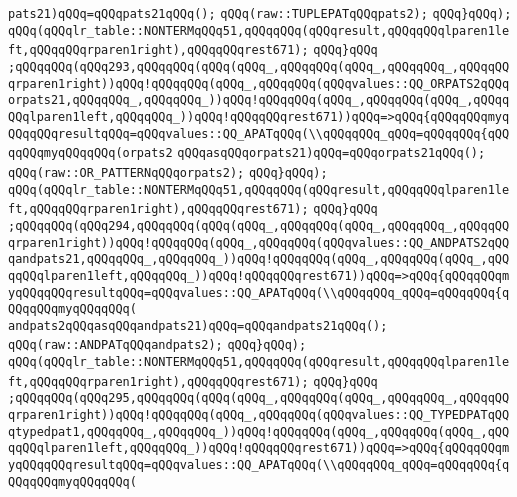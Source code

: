 \verb|pats21)qQQq=qQQqpats21qQQq();|\newline
\verb|qQQq(raw::TUPLEPATqQQqpats2);|\newline
\verb|qQQq}qQQq);|\newline
\verb|qQQq(qQQqlr_table::NONTERMqQQq51,qQQqqQQq(qQQqresult,qQQqqQQqlparen1left,qQQqqQQqrparen1right),qQQqqQQqrest671);|\newline
\verb|qQQq}qQQq|\newline
\verb|;qQQqqQQq(qQQq293,qQQqqQQq(qQQq(qQQq_,qQQqqQQq(qQQq_,qQQqqQQq_,qQQqqQQqrparen1right))qQQq!qQQqqQQq(qQQq_,qQQqqQQq(qQQqvalues::QQ_ORPATS2qQQqorpats21,qQQqqQQq_,qQQqqQQq_))qQQq!qQQqqQQq(qQQq_,qQQqqQQq(qQQq_,qQQqqQQqlparen1left,qQQqqQQq_))qQQq!qQQqqQQqrest671))qQQq=>qQQq{qQQqqQQqmyqQQqqQQqresultqQQq=qQQqvalues::QQ_APATqQQq(\\qQQqqQQq_qQQq=qQQqqQQq{qQQqqQQqmyqQQqqQQq(orpats2|\newline
\verb|qQQqasqQQqorpats21)qQQq=qQQqorpats21qQQq();|\newline
\verb|qQQq(raw::OR_PATTERNqQQqorpats2);|\newline
\verb|qQQq}qQQq);|\newline
\verb|qQQq(qQQqlr_table::NONTERMqQQq51,qQQqqQQq(qQQqresult,qQQqqQQqlparen1left,qQQqqQQqrparen1right),qQQqqQQqrest671);|\newline
\verb|qQQq}qQQq|\newline
\verb|;qQQqqQQq(qQQq294,qQQqqQQq(qQQq(qQQq_,qQQqqQQq(qQQq_,qQQqqQQq_,qQQqqQQqrparen1right))qQQq!qQQqqQQq(qQQq_,qQQqqQQq(qQQqvalues::QQ_ANDPATS2qQQqandpats21,qQQqqQQq_,qQQqqQQq_))qQQq!qQQqqQQq(qQQq_,qQQqqQQq(qQQq_,qQQqqQQqlparen1left,qQQqqQQq_))qQQq!qQQqqQQqrest671))qQQq=>qQQq{qQQqqQQqmyqQQqqQQqresultqQQq=qQQqvalues::QQ_APATqQQq(\\qQQqqQQq_qQQq=qQQqqQQq{qQQqqQQqmyqQQqqQQq(|\newline
\verb|andpats2qQQqasqQQqandpats21)qQQq=qQQqandpats21qQQq();|\newline
\verb|qQQq(raw::ANDPATqQQqandpats2);|\newline
\verb|qQQq}qQQq);|\newline
\verb|qQQq(qQQqlr_table::NONTERMqQQq51,qQQqqQQq(qQQqresult,qQQqqQQqlparen1left,qQQqqQQqrparen1right),qQQqqQQqrest671);|\newline
\verb|qQQq}qQQq|\newline
\verb|;qQQqqQQq(qQQq295,qQQqqQQq(qQQq(qQQq_,qQQqqQQq(qQQq_,qQQqqQQq_,qQQqqQQqrparen1right))qQQq!qQQqqQQq(qQQq_,qQQqqQQq(qQQqvalues::QQ_TYPEDPATqQQqtypedpat1,qQQqqQQq_,qQQqqQQq_))qQQq!qQQqqQQq(qQQq_,qQQqqQQq(qQQq_,qQQqqQQqlparen1left,qQQqqQQq_))qQQq!qQQqqQQqrest671))qQQq=>qQQq{qQQqqQQqmyqQQqqQQqresultqQQq=qQQqvalues::QQ_APATqQQq(\\qQQqqQQq_qQQq=qQQqqQQq{qQQqqQQqmyqQQqqQQq(|\newline
